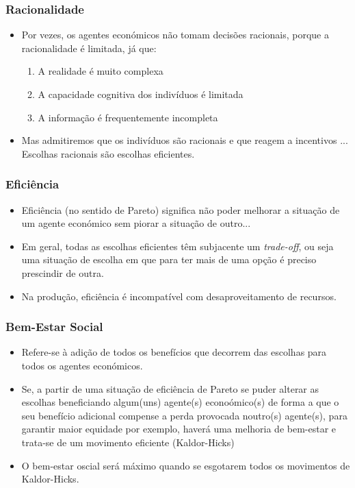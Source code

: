 \begin{frame}
	\frametitle{Racionalidade}

	\begin{itemize}
		\item Por vezes, os agentes econ\'omicos n\~ao tomam decis\~oes racionais, porque a racionalidade \'e limitada, j\'a que:\pause
			\begin{enumerate}
				\item A realidade \'e muito complexa \pause
				\item A capacidade cognitiva dos indiv\'iduos \'e limitada \pause
				\item A informa\c c\~ao \'e frequentemente incompleta \pause
			\end{enumerate}

		\item Mas admitiremos que os indiv\'iduos s\~ao racionais e que reagem a incentivos ... Escolhas racionais s\~ao escolhas eficientes.

	\end{itemize}


\end{frame}

\begin{frame}
	\frametitle{Efici\^encia}

	\pause
	\begin{itemize}
		\item Efici\^encia (no sentido de Pareto) significa n\~ao poder melhorar a situa\c c\~ao de um agente econ\'omico sem piorar a situa\c c\~ao de outro...\pause
		\item Em geral, todas as escolhas eficientes t\^em subjacente um \emph{trade-off}, ou seja uma situa\c c\~ao de escolha em que para ter mais de uma op\c c\~ao \'e preciso prescindir de outra.\pause
		\item Na produ\c c\~ao, efici\^encia \'e incompat\'ivel com desaproveitamento de recursos.
	\end{itemize}
\end{frame}

\begin{frame}
	\frametitle{Bem-Estar Social}
	\begin{itemize}
		\item Refere-se \`a adi\c c\~ao de todos os benef\'icios que decorrem das escolhas para todos os agentes econ\'omicos. \pause
		\item Se, a partir de uma situa\c c\~ao de efici\^encia de Pareto se puder alterar as escolhas beneficiando algum(uns) agente(s) econo\'omico(s) de forma a que o seu benef\'icio adicional compense a perda provocada noutro(s) agente(s), para garantir maior equidade por exemplo, haver\'a uma melhoria de bem-estar e trata-se de um movimento eficiente (Kaldor-Hicks) \pause
		\item O bem-estar oscial ser\'a m\'aximo quando se esgotarem todos os movimentos de Kaldor-Hicks.
	\end{itemize}
\end{frame}
